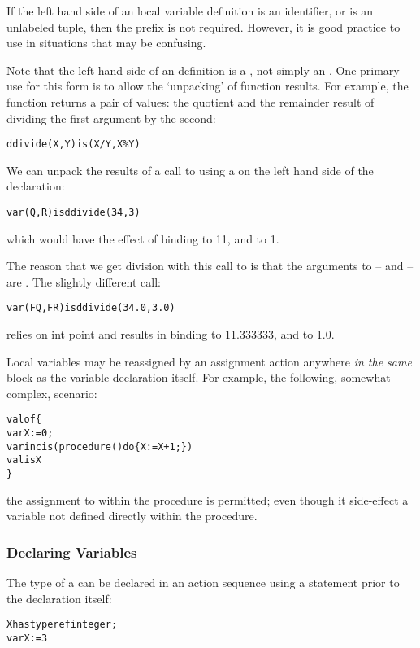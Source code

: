 If the left hand side of an  local variable definition is an identifier, or is an unlabeled tuple, then the  prefix is not required. However, it is good practice to use  in situations that may be confusing.

\begin{aside}
Note that the left hand side of an  definition is a , not simply an . One primary use for this form is to allow the `unpacking' of function results. For example, the function  returns a pair of values: the quotient and the remainder result of dividing the first argument by the second:
\begin{alltt}
ddivide(X,Y) is (X/Y,X\%Y)
\end{alltt}
We can unpack the results of a call to  using a  on the left hand side of the declaration:
\begin{alltt}
var (Q,R) is ddivide(34,3)
\end{alltt}
which would have the effect of binding  to 11, and  to 1.
\begin{aside}
The reason that we get  division with this call to  is that the arguments to  --  and  -- are . The slightly different call:
\begin{alltt}
var (FQ,FR) is ddivide(34.0,3.0)
\end{alltt}
relies on int point  and results in binding  to 11.333333, and  to 1.0.
\end{aside}
\end{aside}

\begin{aside}
Local variables may be reassigned by an assignment action anywhere \emph{in the same} block as the variable declaration itself. For example, the following, somewhat complex, scenario:
\begin{alltt}
valof\{
  var X := 0;
  var inc is (procedure() do \{ X:=X+1; \})
  valis X
\}
\end{alltt}
the assignment to  within the  procedure is permitted; even though it  side-effect a variable not defined directly within the procedure.
\end{aside}

\subsubsection{Declaring Variables}
The type of a  can be declared in an action sequence using a  statement prior to the declaration itself:
\begin{alltt}
X has type ref integer;
var X := 3
\end{alltt}

